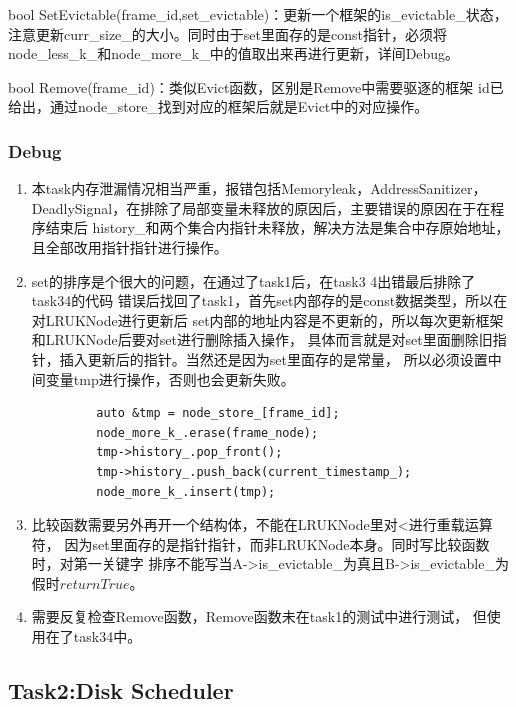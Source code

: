 \documentclass[a4paper]{article}
\begin{document}
bool SetEvictable(frame\_id,set\_evictable)：更新一个框架的is\_evictable\_状态，
注意更新curr\_size\_的大小。同时由于set里面存的是const指针，必须将
node\_less\_k\_和node\_more\_k\_中的值取出来再进行更新，详间Debug。

bool Remove(frame\_id)：类似Evict函数，区别是Remove中需要驱逐的框架
id已给出，通过node\_store\_找到对应的框架后就是Evict中的对应操作。

\subsubsection{Debug}

\begin{enumerate}
   \item 本task内存泄漏情况相当严重，报错包括Memoryleak，AddressSanitizer，
   DeadlySignal，在排除了局部变量未释放的原因后，主要错误的原因在于在程序结束后
   history\_和两个集合内指针未释放，解决方法是集合中存原始地址，且全部改用指针指针进行操作。
   
   \item set的排序是个很大的问题，在通过了task1后，在task3 4出错最后排除了task34的代码
   错误后找回了task1，首先set内部存的是const数据类型，所以在对LRUKNode进行更新后
   set内部的地址内容是不更新的，所以每次更新框架和LRUKNode后要对set进行删除插入操作，
   具体而言就是对set里面删除旧指针，插入更新后的指针。当然还是因为set里面存的是常量，
   所以必须设置中间变量tmp进行操作，否则也会更新失败。
   \begin{verbatim}
         auto &tmp = node_store_[frame_id];
         node_more_k_.erase(frame_node);
         tmp->history_.pop_front();
         tmp->history_.push_back(current_timestamp_);
         node_more_k_.insert(tmp);
   \end{verbatim}
   \item 比较函数需要另外再开一个结构体，不能在LRUKNode里对<进行重载运算符，
   因为set里面存的是指针指针，而非LRUKNode本身。同时写比较函数时，对第一关键字
   排序不能写当A->is\_evictable\_为真且B->is\_evictable\_为假时$return True$。

   \item 需要反复检查Remove函数，Remove函数未在task1的测试中进行测试，
   但使用在了task34中。
\end{enumerate}

\subsection{Task2:Disk Scheduler}
\end{document}
